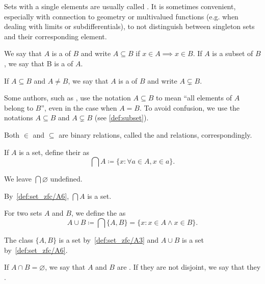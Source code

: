 \begin{remark}\label{remark:singleton_sets}
  Sets with a single elements are usually called . It is sometimes convenient, especially with connection to geometry or multivalued functions (e.g. when dealing with limits or subdifferentials), to not distinguish between singleton sets and their corresponding element.
\end{remark}

\begin{definition}\label{def:subset}
  We say that \( A \) is a  of \( B \) and write \( A \subseteq B \) if \( x \in A \implies x \in B \). If \( A \) is a subset of \( B \), we say that B is a  of \( A \).

  If \( A \subseteq B \) and \( A \neq B \), we say that \( A \) is a  of \( B \) and write \( A \subsetneq B \).
\end{definition}

\begin{remark}\label{remark:subset_notation}
  Some authors, such as \cite{Kelley1955}, use the notation \( A \subseteq B \) to mean \enquote{all elements of \( A \) belong to \( B \)}, even in the case when \( A = B \). To avoid confusion, we use the notations \( A \subseteq B \) and \( A \subsetneq B \) (see \cref{def:subset}).
\end{remark}

\begin{remark}\label{remark:subset_and_membership_relations}
  Both \( \in \) and \( \subseteq \) are binary relations, called the  and  relations, correspondingly.
\end{remark}

\begin{definition}\label{def:set_intersection}\cite[24]{Enderton1977}
  If \( A \) is a set, define their  as
  \begin{equation*}
    \bigcap A \coloneqq \{ x \colon \forall a \in A, x \in a \}.
  \end{equation*}

  We leave \( \bigcap \varnothing \) undefined.

  By~\ref{def:set_zfc/A6}, \( \bigcap A \) is a set.

  For two sets \( A \) and \( B \), we define the  as
  \begin{equation*}
    A \cup B \coloneqq \bigcap \{ A, B \} = \{ x \colon x \in A \land x \in B \}.
  \end{equation*}

  The class \( \{ A, B \} \) is a set by~\ref{def:set_zfc/A3} and \( A \cup B \) is a set by~\ref{def:set_zfc/A6}.

  If \( A \cap B = \varnothing \), we say that \( A \) and \( B \) are . If they are not disjoint, we say that they .
\end{definition}

